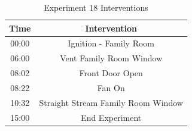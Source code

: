 \documentclass{article}
\begin{document}
\begin{table}[H]
	\centering
	\caption{Experiment 18 Interventions}
	\begin{tabular}{|c|c|} 
		\hline
		Time & Intervention \\ \hline \hline
		00:00 & Ignition - Family Room \\ \hline
		06:00 & Vent Family Room Window \\ \hline
		08:02 & Front Door Open \\ \hline
		08:22 & Fan On \\ \hline
		10:32 & Straight Stream Family Room Window \\ \hline
		15:00 & End Experiment \\ \hline
	\end{tabular}
	\label{Table:Exp18Interventions}
\end{table}
\end{document}
